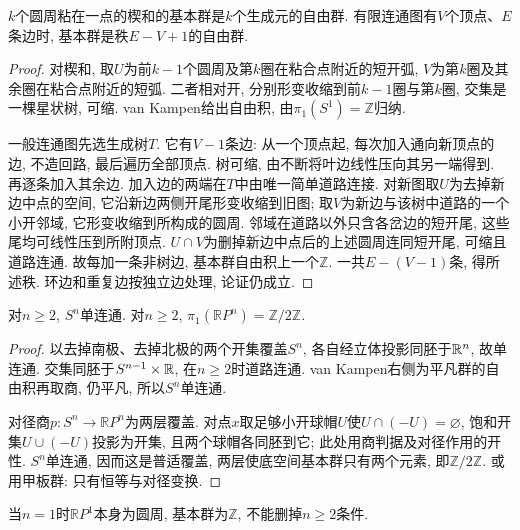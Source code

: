 \begin{proposition}\label{thm:graph-pi1}
$k$个圆周粘在一点的楔和的基本群是$k$个生成元的自由群. 有限连通图有$V$个顶点、$E$条边时, 基本群是秩$E-V+1$的自由群.
\end{proposition}
\begin{proof}
对楔和, 取$U$为前$k-1$个圆周及第$k$圈在粘合点附近的短开弧, $V$为第$k$圈及其余圈在粘合点附近的短弧. 二者相对开, 分别形变收缩到前$k-1$圈与第$k$圈, 交集是一棵星状树, 可缩. van Kampen给出自由积, 由$\pi_1(S^1)=\mathbb Z$归纳.

一般连通图先选生成树$T$. 它有$V-1$条边: 从一个顶点起, 每次加入通向新顶点的边, 不造回路, 最后遍历全部顶点. 树可缩, 由不断将叶边线性压向其另一端得到. 再逐条加入其余边. 加入边的两端在$T$中由唯一简单道路连接. 对新图取$U$为去掉新边中点的空间, 它沿新边两侧开尾形变收缩到旧图; 取$V$为新边与该树中道路的一个小开邻域, 它形变收缩到所构成的圆周. 邻域在道路以外只含各岔边的短开尾, 这些尾均可线性压到所附顶点. $U\cap V$为删掉新边中点后的上述圆周连同短开尾, 可缩且道路连通. 故每加一条非树边, 基本群自由积上一个$\mathbb Z$. 一共$E-(V-1)$条, 得所述秩. 环边和重复边按独立边处理, 论证仍成立.
\end{proof}

\begin{proposition}\label{thm:sphere-simply-connected}
对$n\ge2$, $S^n$单连通. 对$n\ge2$, $\pi_1(\mathbb RP^n)=\mathbb Z/2\mathbb Z$.
\end{proposition}
\begin{proof}
以去掉南极、去掉北极的两个开集覆盖$S^n$, 各自经立体投影同胚于$\mathbb R^n$, 故单连通. 交集同胚于$S^{n-1}\times\mathbb R$, 在$n\ge2$时道路连通. van Kampen右侧为平凡群的自由积再取商, 仍平凡, 所以$S^n$单连通.

对径商$p:S^n\to\mathbb RP^n$为两层覆盖. 对点$x$取足够小开球帽$U$使$U\cap(-U)=\varnothing$, 饱和开集$U\cup(-U)$投影为开集, 且两个球帽各同胚到它; 此处用商判据及对径作用的开性. $S^n$单连通, 因而这是普适覆盖, 两层使底空间基本群只有两个元素, 即$\mathbb Z/2\mathbb Z$. 或用甲板群: 只有恒等与对径变换.
\end{proof}
当$n=1$时$\mathbb RP^1$本身为圆周, 基本群为$\mathbb Z$, 不能删掉$n\ge2$条件.

